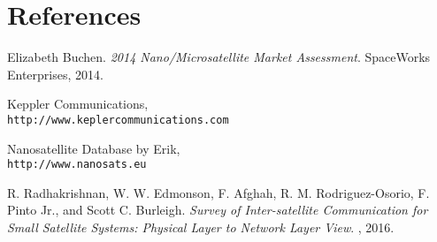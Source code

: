 \section{References}
\begin{thebibliography}{4}
Elizabeth Buchen. 
\textit{2014 Nano/Microsatellite Market Assessment}. 
SpaceWorks Enterprises, 2014.
 
Keppler Communications,
\\\texttt{http://www.keplercommunications.com}

Nanosatellite Database by Erik,
\\\texttt{http://www.nanosats.eu}


R. Radhakrishnan, W. W. Edmonson, F. Afghah, R. M. Rodriguez-Osorio, F. Pinto
Jr., and Scott C. Burleigh. 
\textit{Survey of Inter-satellite Communication for Small Satellite Systems: Physical Layer to Network Layer View}. 
, 2016.
\end{thebibliography}

